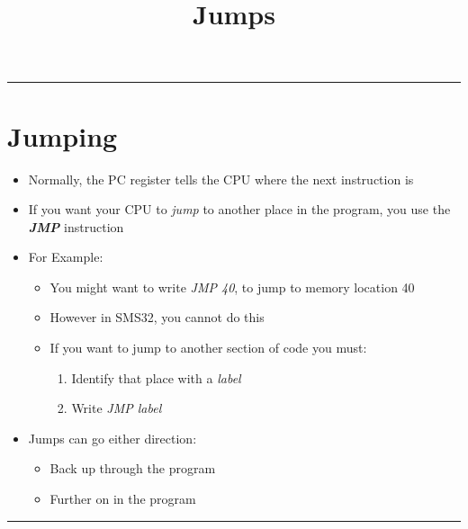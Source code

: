 \documentclass{article}
\title{Jumps}
\begin{document}
\maketitle

\begin{center}
  \rule{0.5\textwidth}{0.4pt}
\end{center}

\section{Jumping}
\begin{itemize}
  \item{Normally, the PC register tells the CPU where the next instruction is}
  \item{If you want your CPU to \textit{jump} to another place in the program, you use the \textbf{\textit{JMP}} instruction}
  \item{For Example:}
  \begin{itemize}
    \item{You might want to write \textit{JMP 40}, to jump to memory location 40}
    \item{However in SMS32, you cannot do this}
    \item{If you want to jump to another section of code you must:}
    \begin{enumerate}
      \item{Identify that place with a \textit{label}}
      \item{Write \textit{JMP label}}
    \end{enumerate}
  \end{itemize}
  \item{Jumps can go either direction:}
  \begin{itemize}
    \item{Back up through the program}
    \item{Further on in the program}
  \end{itemize}
\end{itemize}

\begin{center}
  \rule{0.5\textwidth}{0.4pt}
\end{center}
\pagebreak
\end{document}
